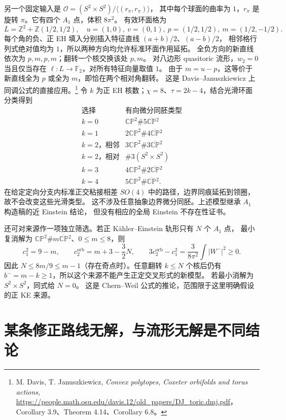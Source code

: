 \documentclass[UTF8,fontset=fandol,zihao=-4,oneside,openany]{ctexbook}
\theoremstyle{cjkplain}
\numberwithin{equation}{chapter}
\begin{document}
另一个固定输入是
\(\mathcal O=(S^2\times S^2)/\langle(r_\pi,r_\pi)\rangle\)，
其中每个球面的曲率为 \(1\)，\(r_\pi\) 是旋转 \(\pi\)。它有四个 \(A_1\) 点，体积 \(8\pi^2\)。
有效环面格为
\[
L=\mathbb Z^2+\mathbb Z(1/2,1/2),\quad
u=(1,0),\ v=(0,1),\ p=(1/2,1/2),\ m=(1/2,-1/2).
\]
每个角的负、正 EH 填入分别插入特征直线 \((a+b)/2\)、\((a-b)/2\)，
相邻格行列式绝对值均为 \(1\)，所以两种方向均允许标准环面作用延拓。
全负方向的新直线依次为 \(p,m,p,m\)；翻转一个核交换该处 \(p,m\)。
对八边形 quasitoric 流形，\(w_2=0\) 当且仅当存在
\(\ell:L\to\mathbb F_2\)，对所有特征向量取值 \(1\)。
由于 \(m=u-p\)，这等价于新直线全为 \(p\) 或全为 \(m\)，即恰在两个相对角翻转。
这是 Davis--Januszkiewicz 上同调公式的直接应用。\footnote{M. Davis, T. Januszkiewicz, \emph{Convex polytopes, Coxeter orbifolds and torus actions}, \url{https://people.math.osu.edu/davis.12/old_papers/DJ_toric.dmj.pdf}，Corollary 3.9、Theorem 4.14、Corollary 6.8。}
令 \(k\) 为正 EH 核数；\(\chi=8\)、\(\tau=2k-4\)，结合光滑环面分类得到
\[
\begin{array}{c|c}
\text{选择}&\text{有向微分同胚类型}\\ \hline
k=0&\mathbb{CP}^2\#5\overline{\mathbb{CP}}{}^2\\
k=1&2\mathbb{CP}^2\#4\overline{\mathbb{CP}}{}^2\\
k=2\text{，相邻}&3\mathbb{CP}^2\#3\overline{\mathbb{CP}}{}^2\\
k=2\text{，相对}&\#3(S^2\times S^2)\\
k=3&4\mathbb{CP}^2\#2\overline{\mathbb{CP}}{}^2\\
k=4&5\mathbb{CP}^2\#\overline{\mathbb{CP}}{}^2.
\end{array}
\]
在给定定向分支内标准正交粘接相差 \(SO(4)\) 中的路径，边界同痕延拓到领圈，故不会改变这些光滑类型。
这不涉及任意抽象边界微分同胚。上述模型继承 \(A_1\) 构造稿的近 Einstein 结论，
但没有相应的全局 Einstein 不存在性证书。

还可对来源作一项独立筛选。若正 Kähler--Einstein 轨形只有 \(N\) 个 \(A_1\) 点，
最小复消解为 \(\mathbb{CP}^2\#m\overline{\mathbb{CP}}{}^2\)、\(0\le m\le8\)，则
\[
c_1^2=9-m,\qquad c_2^{\mathrm{orb}}=m+3-\frac32N,
\qquad3c_2^{\mathrm{orb}}-c_1^2
=\frac3{8\pi^2}\int|W^-|^2\ge0.
\]
因此 \(N\le8m/9\le m-1\)（存在奇点时）。任意翻转 \(k\le N\) 个核后仍有
\(b^-=m-k\ge1\)，所以这个来源不能产生正定交叉形式的新模型。
若最小消解为 \(S^2\times S^2\)，同式给 \(N=0\)。
这是 Chern--Weil 公式的推论，范围限于这里明确假设的正 KE 来源。

\section{某条修正路线无解，与流形无解是不同结论}
\label{FND:routeobstructions}
\end{document}
